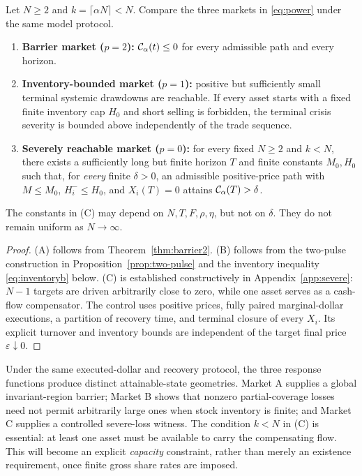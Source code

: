 \documentclass[review,hidelinks,onefignum,onetabnum]{siamonline250211}
\begin{document}
\begin{theorem}\label{thm:ABC}
Let $N\ge2$ and $k=\lceil\alpha N\rceil<N$. Compare the three markets in \eqref{eq:power} under the same model protocol.
\begin{enumerate}[label=\textup{(\Alph*)},leftmargin=2em,itemsep=0.15em]
\item \textbf{Barrier market ($p=2$):} $\mathcal{C}_\alpha(t)\le0$ for every admissible path and every horizon.
\item \textbf{Inventory-bounded market ($p=1$):} positive but sufficiently small terminal systemic drawdowns are reachable. If every asset starts with a fixed finite inventory cap $H_0$ and short selling is forbidden, the terminal crisis severity is bounded above independently of the trade sequence.
\item \textbf{Severely reachable market ($p=0$):} for every fixed $N\ge2$ and $k<N$, there exists a sufficiently long but finite horizon $T$ and finite constants $M_0,H_0$ such that, for \emph{every} finite $\delta>0$, an admissible positive-price path with $M\le M_0$, $H_i^-\le H_0$, and $X_i(T)=0$ attains $\mathcal{C}_\alpha(T)>\delta$.
\end{enumerate}
The constants in (C) may depend on $N,T,F,\rho,\eta$, but not on $\delta$. They do not remain uniform as $N\to\infty$.
\end{theorem}
\begin{proof}
(A) follows from Theorem~\ref{thm:barrier2}. (B) follows from the two-pulse construction in Proposition~\ref{prop:two-pulse} and the inventory inequality \eqref{eq:inventoryb} below. (C) is established constructively in Appendix~\ref{app:severe}: $N-1$ targets are driven arbitrarily close to zero, while one asset serves as a cash-flow compensator. The control uses positive prices, fully paired marginal-dollar executions, a partition of recovery time, and terminal closure of every $X_i$. Its explicit turnover and inventory bounds are independent of the target final price $\varepsilon\downarrow0$.
\end{proof}

Under the same executed-dollar and recovery protocol, the three response functions produce distinct attainable-state geometries. Market A supplies a global invariant-region barrier; Market B shows that nonzero partial-coverage losses need not permit arbitrarily large ones when stock inventory is finite; and Market C supplies a controlled severe-loss witness. The condition $k<N$ in (C) is essential: at least one asset must be available to carry the compensating flow. This will become an explicit \emph{capacity} constraint, rather than merely an existence requirement, once finite gross share rates are imposed.
\end{document}

